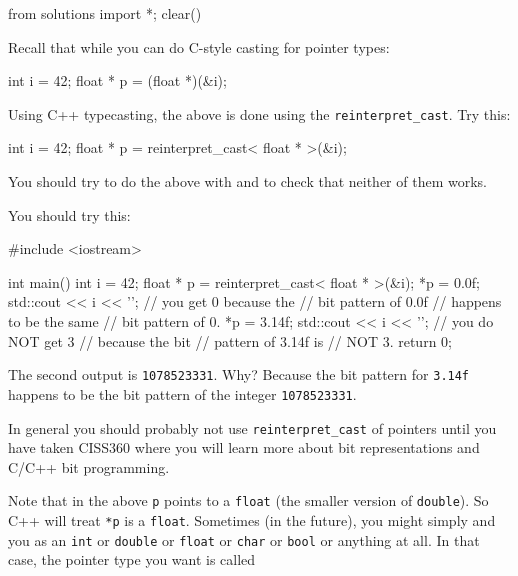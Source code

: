 \begin{python0}
from solutions import *; clear()
\end{python0}

Recall that while you can do C-style casting for pointer types:

\begin{console}
int i = 42;
float * p = (float *)(&i);
\end{console}

Using C++ typecasting, the above is done using the \texttt{reinterpret\_cast}. Try this:

\begin{console}
int i = 42;
float * p = reinterpret_cast< float * >(&i);
\end{console}

You should try to do the above with \texttt{} and \texttt{} to check that neither of them works.

You should try this:

\begin{console}
#include <iostream>

int main()
{   
    int i = 42;
    float * p = reinterpret_cast< float * >(&i);
    *p = 0.0f;
    std::cout << i << '\n'; // you get 0 because the
                            // bit pattern of 0.0f
                            // happens to be the same
                            // bit pattern of 0.
    *p = 3.14f;
    std::cout << i << '\n'; // you do NOT get 3
                            // because the bit
                            // pattern of 3.14f is
                            // NOT 3.
    return 0;
}
\end{console}

The second output is \texttt{1078523331}. Why? Because the bit pattern for \texttt{3.14f} happens to be the bit pattern of the integer \texttt{1078523331}.

In general you should probably not use \texttt{reinterpret\_cast} of pointers until you have taken CISS360 where you will learn more about bit representations and C/C++ bit programming.

Note that in the above \texttt{p} points to a \texttt{float} (the smaller version of \texttt{double}). So C++ will treat \texttt{*p} is a \texttt{float}. Sometimes (in the future), you might simply  and you  as an \texttt{int} or \texttt{double} or \texttt{float} or \texttt{char} or \texttt{bool} or anything at all. In that case, the pointer type you want is called

